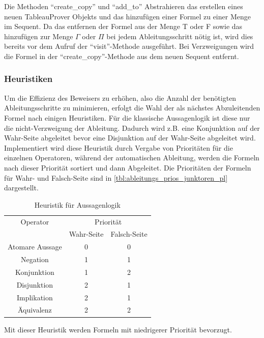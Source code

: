Die Methoden ``create\_copy'' und ``add\_to'' Abstrahieren das erstellen eines neuen TableauProver Objekts und das hinzufügen einer Formel zu einer Menge im Sequent. Da das entfernen der Formel aus der Menge T oder F sowie das hinzufügen zur Menge $\Gamma$ oder $\Pi$ bei jedem Ableitungsschritt nötig ist, wird dies bereits vor dem Aufruf der ``visit''-Methode ausgeführt. Bei Verzweigungen wird die Formel in der ``create\_copy''-Methode aus dem neuen Sequent entfernt.

\subsubsection{\label{sec:heuristiken}Heuristiken}
Um die Effizienz des Beweisers zu erhöhen, also die Anzahl der benötigten Ableitungsschritte zu minimieren, erfolgt die Wahl der als nächstes Abzuleitenden Formel nach einigen Heuristiken. Für die klassische Aussagenlogik ist diese nur die nicht-Verzweigung der Ableitung. Dadurch wird z.B. eine Konjunktion auf der Wahr-Seite abgeleitet bevor eine Disjunktion auf der Wahr-Seite abgeleitet wird. Implementiert wird diese Heuristik durch Vergabe von Prioritäten für die einzelnen Operatoren, während der automatischen Ableitung, werden die Formeln nach dieser Priorität sortiert und dann Abgeleitet. Die Prioritäten der Formeln für Wahr- und Falsch-Seite sind in \autoref{tbl:ableitungs_prios_junktoren_pl} dargestellt.

\begin{table}[h]
\begin{center}
\begin{tabular}{|c|c|c|}
\hline
Operator & \multicolumn{2}{c|}{Priorität} \\
\cline{2-3}
 & Wahr-Seite & Falsch-Seite \\
\hline
Atomare Aussage & 0 & 0 \\
Negation & 1 & 1 \\
Konjunktion & 1 & 2 \\
Disjunktion & 2 & 1 \\
Implikation & 2 & 1 \\
Äquivalenz & 2 & 2 \\
\hline
\end{tabular}
\end{center}
\caption{\label{tbl:ableitungs_prios_junktoren_pl}Heuristik für Aussagenlogik}
\end{table}

Mit dieser Heuristik werden Formeln mit niedrigerer Priorität bevorzugt.

